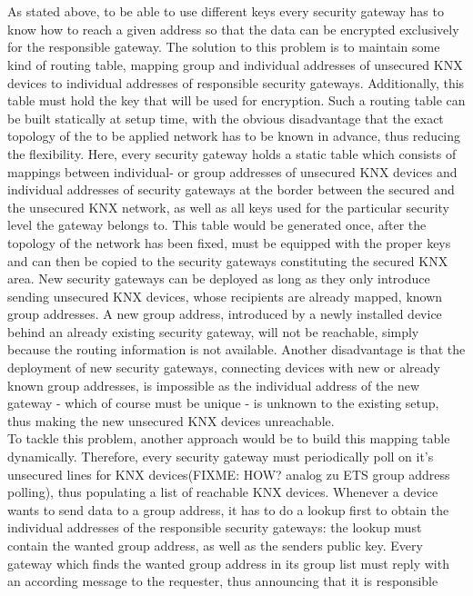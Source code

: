 \\
\\
As stated above, to be able to use different keys every security gateway has to know how to reach a given address so that the data can be encrypted
exclusively for the responsible gateway. The solution to this problem is to maintain some kind of routing table, mapping group and individual addresses of unsecured
KNX devices to individual addresses of responsible security gateways. Additionally, this table must hold the key that will be used for encryption.
Such a routing table can be built statically at setup time, with the obvious disadvantage
that the exact topology of the to be applied network has to be known in advance, thus reducing the flexibility. Here, every security gateway holds a static 
table which consists of mappings between individual- or group addresses of unsecured KNX devices and individual addresses of security gateways at the border
between the secured and the unsecured KNX network, as well as all keys used for the particular security level the gateway belongs to.
This table would be generated once, after the topology of the network has been fixed, must be equipped with the proper keys and can then
be copied to the security gateways constituting the secured KNX area. New security gateways can be deployed as long as they only introduce sending 
unsecured KNX devices, whose recipients are already mapped, known group addresses. A new group address, introduced by a newly installed device behind
an already existing security gateway, will not be reachable, simply because the routing information is not available. 
Another disadvantage is that the deployment of new
security gateways, connecting devices with new or already known group addresses, is impossible as the individual address of the new gateway - which of
course must be unique - is unknown to the existing setup, thus making the new unsecured KNX devices unreachable.
\\
To tackle this problem, another approach would be to build this mapping table dynamically. Therefore, every security gateway must periodically poll
on it's unsecured lines for KNX devices(FIXME: HOW? analog zu ETS group address polling), thus populating a list of reachable KNX devices. Whenever a 
device wants to send data to a group address, it has to do a lookup first to obtain the individual addresses of the responsible security gateways: the lookup
must contain the wanted group address, as well as the senders public key.
Every 
gateway which finds the wanted group address in its group list must reply with an according message to the requester, thus announcing that it is responsible
